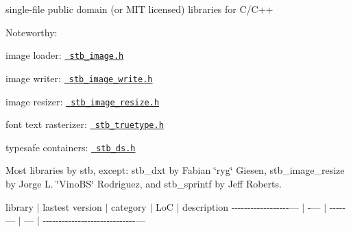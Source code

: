 single-\/file public domain (or MIT licensed) libraries for C/\+C++

Noteworthy\+:


\begin{DoxyItemize}
\item image loader\+: \href{stb_image.h}{\texttt{ stb\+\_\+image.\+h}}
\item image writer\+: \href{stb_image_write.h}{\texttt{ stb\+\_\+image\+\_\+write.\+h}}
\item image resizer\+: \href{stb_image_resize.h}{\texttt{ stb\+\_\+image\+\_\+resize.\+h}}
\item font text rasterizer\+: \href{stb_truetype.h}{\texttt{ stb\+\_\+truetype.\+h}}
\item typesafe containers\+: \href{stb_ds.h}{\texttt{ stb\+\_\+ds.\+h}}
\end{DoxyItemize}

Most libraries by stb, except\+: stb\+\_\+dxt by Fabian \char`\"{}ryg\char`\"{} Giesen, stb\+\_\+image\+\_\+resize by Jorge L. \char`\"{}\+Vino\+BS\char`\"{} Rodriguez, and stb\+\_\+sprintf by Jeff Roberts.

\label{_stb_libs}%


library $\vert$ lastest version $\vert$ category $\vert$ LoC $\vert$ description -\/-\/-\/-\/-\/-\/-\/-\/-\/-\/-\/-\/-\/-\/-\/-\/-\/-\/--- $\vert$ -\/--- $\vert$ -\/-\/-\/-\/-\/--- $\vert$ --- $\vert$ -\/-\/-\/-\/-\/-\/-\/-\/-\/-\/-\/-\/-\/-\/-\/-\/-\/-\/-\/-\/-\/-\/-\/-\/-\/-\/-\/-\/-\/--- 